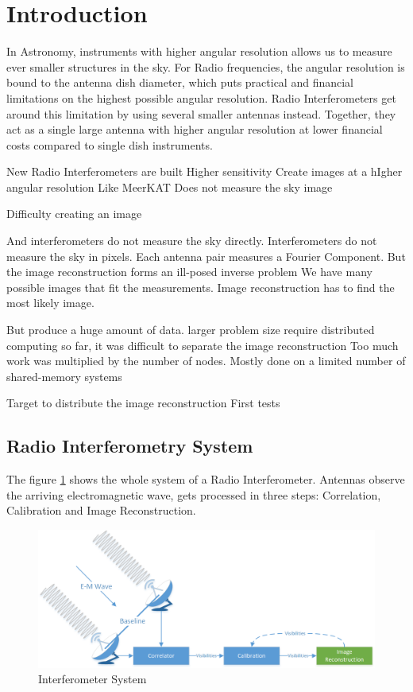 \section{Introduction}
In Astronomy, instruments with higher angular resolution allows us to measure ever smaller structures in the sky. For Radio frequencies, the angular resolution is bound to the antenna dish diameter, which puts practical and financial limitations on the highest possible angular resolution. Radio Interferometers get around this limitation by using several smaller antennas instead. Together, they act as a single large antenna with higher angular resolution at lower financial costs compared to single dish instruments.

New Radio Interferometers are built
Higher sensitivity
Create images at a hIgher angular resolution
Like MeerKAT
Does not measure the sky image

Difficulty creating an image

And interferometers do not measure the sky directly. Interferometers do not measure the sky in pixels. Each antenna pair measures a Fourier Component. 
But the image reconstruction forms an ill-posed inverse problem
We have many possible images that fit the measurements.
Image reconstruction has to find the most likely image.

But produce a huge amount of data.
larger problem size require distributed computing
so far, it was difficult to separate the image reconstruction
Too much work was multiplied by the number of nodes.
Mostly done on a limited number of shared-memory systems

Target to distribute the image reconstruction
First tests


\subsection{Radio Interferometry System}
The figure \ref{intro:system} shows the whole system of a Radio Interferometer. Antennas observe the arriving electromagnetic wave, gets processed in three steps: Correlation, Calibration and Image Reconstruction. 

\begin{figure}[h]
	\centering
	\includegraphics[width=0.80\linewidth]{./chapters/01.intro/system.png}
	\caption{Interferometer System}
	\label{intro:system}
\end{figure}


